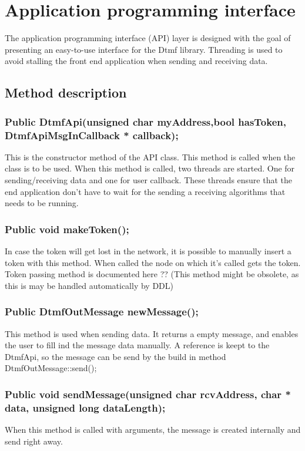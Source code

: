 \section{Application programming interface} %
The application programming interface (API) layer is designed with the goal of presenting an easy-to-use interface for the Dtmf library. Threading is used to avoid stalling the front end application when sending and receiving data. 
\subsection{Method description}
\subsubsection*{Public DtmfApi(unsigned char myAddress,bool hasToken, DtmfApiMsgInCallback * callback);}
This is the constructor method of the API class. This method is called when the class is to be used.
When this method is called, two threads are started. One for sending/receiving data and one for user callback. These threads ensure that the end application don't have to wait for the sending a receiving algorithms that needs to be running.

\subsubsection*{Public void makeToken();}
In case the token will get lost in the network, it is possible to manually insert a token with this method. When called the node on which it's called gets the token. Token passing method is documented here ?? (This method might be obsolete, as this is may be handled automatically by DDL)

\subsubsection*{Public DtmfOutMessage newMessage();}
This method is used when sending data. It returns a empty message, and enables the user to fill ind the message data manually. A reference is keept to the DtmfApi, so the message can be send by the build in method DtmfOutMessage::send();

\subsubsection*{Public void sendMessage(unsigned char rcvAddress, char * data, unsigned long dataLength);}
When this method is called with arguments, the message is created internally and send right away.

